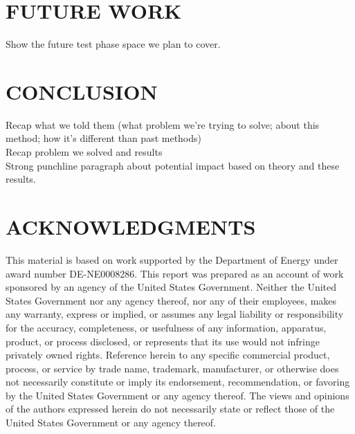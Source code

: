 \documentclass[12pt]{article}
\begin{document}
%
\section{FUTURE WORK} 
\label{sect::references}

Show the future test phase space we plan to cover. 


%
\section{CONCLUSION} 
\label{sect::conclusion}

Recap what we told them (what problem we're trying to solve; about this method; how it's different than past methods)\\
Recap problem we solved and results\\
Strong punchline paragraph about potential impact based on theory and these results.

%
\section*{ACKNOWLEDGMENTS}

This material is based on work supported by the Department of Energy under award number DE-NE0008286. This report was prepared as an account of work sponsored by an agency of the United States Government. Neither the United States Government nor any agency thereof, nor any of their employees, makes any warranty, express or implied, or assumes any legal liability or responsibility for the accuracy, completeness, or usefulness of any information, apparatus, product, or process disclosed, or represents that its use would not infringe privately owned rights. Reference herein to any specific commercial product, process, or service by trade name, trademark, manufacturer, or otherwise does not necessarily constitute or imply its endorsement, recommendation, or favoring by the United States Government or any agency thereof. The views and opinions of the authors expressed herein do not necessarily state or reflect those of the United States Government or any agency thereof.
\end{document}
